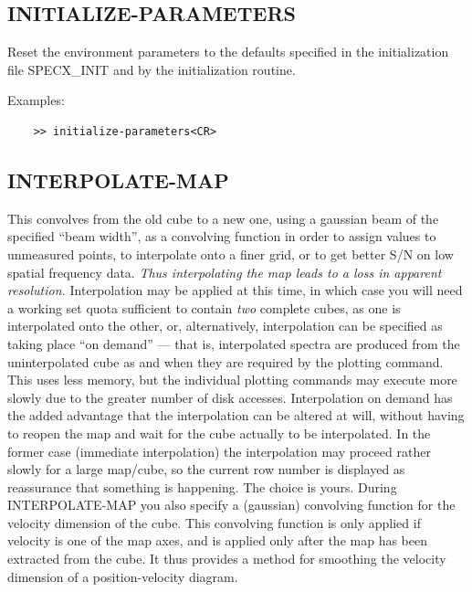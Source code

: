 \documentclass[11pt,twoside]{report}
\begin{document}
\subsection{INITIALIZE-PARAMETERS} 

Reset the environment  parameters to the defaults
specified in the initialization file SPECX\_INIT  and by the
initialization routine. 

Examples:
\begin{verbatim}
    >> initialize-parameters<CR>
\end{verbatim}

\subsection{INTERPOLATE-MAP} 

This convolves from the old cube to a new one, using a gaussian beam of the
specified ``beam width'',  as a convolving function in order
to assign values to unmeasured points, to interpolate onto a finer grid, or to
get better S/N on low spatial frequency data.  {\em
Thus interpolating the map leads to a loss in apparent resolution.}
Interpolation may be applied at this time, in which case you will need a
working set quota sufficient to contain {\em two} complete cubes, as one is
interpolated onto the other, or, alternatively, interpolation can be specified
as taking place ``on demand'' --- that is, interpolated spectra are produced
from the uninterpolated cube as and when they are required by the plotting
command. This uses less memory, but the individual plotting commands may
execute more slowly due to the greater number of disk accesses. Interpolation
on demand has the added advantage that the interpolation can be altered at
will, without having to reopen the map and wait for the cube actually to be
interpolated. In the former case (immediate interpolation) the interpolation
may proceed rather slowly for a large map/cube, so the current row number is
displayed as reassurance that something is happening. The choice is yours.
During INTERPOLATE-MAP you also specify a (gaussian) convolving function for
the velocity dimension of the cube. This convolving function is only applied if
velocity is one of the map axes, and is applied only after the map has been
extracted from the cube. It thus provides a method for smoothing the velocity
dimension of a position-velocity diagram. 
\end{document}
